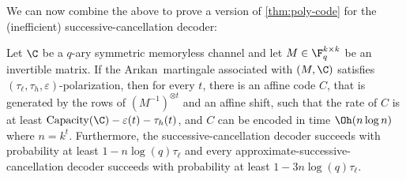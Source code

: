 \documentclass[11pt]{article}
\newcommand{\Arikan}{Ar\i kan}
\newcommand{\two}{}
\begin{document}
We can now combine the above to prove
a version of
\cref{thm:poly-code} for the (inefficient) successive-cancellation decoder:

\begin{theorem}
	\label{thm:sc-decoder-quant}
	Let $\C$ be a $q$-ary symmetric memoryless channel and let $M \in \F_q^{k \times k}$ be an
	invertible matrix.
	If the \Arikan\ martingale associated with $(M,\C)$ satisfies $(\tau_\ell, \tau_h,
	\varepsilon)$-polarization, then for every $t$, there is an affine code $C$,
	that is generated by the rows of $(M^{-1})^{\otimes t}$ and an affine shift,
	such that the rate of $C$ is at least $\mathrm{Capacity}(\C) - \varepsilon(t) -
	\two \tau_h(t)$, and $C$ can be encoded in time $\Oh(n \log n)$ where $n = k^t$.
	Furthermore, the successive-cancellation decoder
	succeeds with probability at least $1-n \log(q) \tau_\ell$
	and every approximate-successive-cancellation decoder
		succeeds with probability at least $1-3n \log(q) \tau_\ell$.
\end{theorem}
\end{document}
